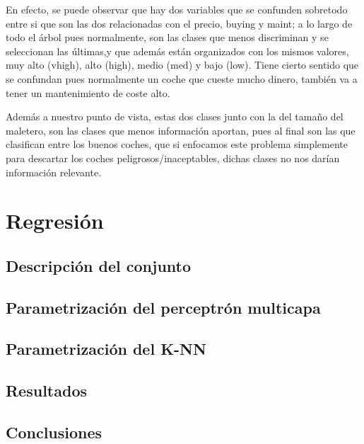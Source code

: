 \documentclass[a4paper, 11pt, twoside, openany, onecolumn, final]{memoir}
\begin{document}
	En efecto, se puede observar que hay dos variables que se confunden sobretodo entre si que son las dos relacionadas con el precio, buying y maint; a lo largo de todo el árbol pues normalmente, son las clases que menos discriminan y se seleccionan las últimas,y que además están organizados con los mismos valores, muy alto (vhigh), alto (high), medio (med) y bajo (low). Tiene cierto sentido que se confundan pues normalmente un coche que cueste mucho dinero, también va a tener un mantenimiento de coste alto. 
	
	Además a nuestro punto de vista, estas dos clases junto con la del tamaño del maletero, son las clases que menos información aportan, pues al final son las que clasifican entre los buenos coches, que si enfocamos este problema simplemente para descartar los coches peligrosos/inaceptables, dichas clases no nos darían información relevante.
	
	\chapter{Regresión}
		\section{Descripción del conjunto}
	\section{Parametrización del perceptrón multicapa}
	\section{Parametrización del K-NN}
	\section{Resultados}
	\section{Conclusiones}
\end{document}
